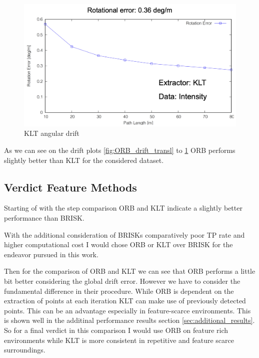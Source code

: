 {{{{                \begin{figure}[!ht]
                    \centering
                    \includegraphics[scale = 0.45]{images/results/mm_drift_angle.png}
                    \caption{KLT angular drift}
                    \label{fig:KLT_drift_angle}
                \end{figure}
            }
            As we can see on the drift plots \cref{fig:ORB_drift_transl} to \cref{fig:KLT_drift_angle} ORB performs slightly better than KLT for the considered dataset.
                    
        }
        \clearpage
        \subsection{Verdict Feature Methods}{

            Starting of with the step comparison ORB and KLT indicate a slightly better performance than BRISK. 

            With the additional consideration of BRISKs comparatively poor TP rate and higher computational cost I would chose ORB or KLT over BRISK for the endeavor pursued in this work.

            Then for the comparison of ORB and KLT we can see that ORB performs a little bit better considering the global drift error. However we have to consider the fundamental difference in their procedure. While ORB is dependent on the extraction of points at each iteration KLT can make use of previously detected points. This can be an advantage especially in feature-scarce environments. This is shown well in the additinal performance results section \cref{sec:additional_results}. So for a final verdict in this comparison I would use ORB on feature rich environments while KLT is more consistent in repetitive and feature scarce surroundings.
            \clearpage
        }

}}
